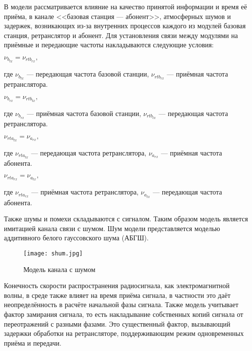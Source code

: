 \begin{onehalfspace}
	
	 В модели рассматривается влияние на качество принятой информации и время её приёма, в канале <<базовая станция — абонент>>, атмосферных шумов и задержек, возникающих из-за внутренних процессов каждого из модулей базовая станция, ретранслятор и абонент. Для установления связи между модулями на приёмные и передающие частоты накладываются следующие условия:
    
	
	\begin{center}
	$\nu_{b_{tx}} = \nu_{rtb_{rx}},$
	 
	где $\nu_{b_{tx}}$ — передающая частота базовой станции, $\nu_{rtb_{rx}}$ — приёмная частота ретранслятора.
	 
	 
	$\nu_{b_{rx}} = \nu_{rtb_{tx}},$
	 
	где $\nu_{b_{rx}}$ — приёмная частота базовой станции, $ \nu_{rtb_{tx}}$ — передающая частота ретранслятора.
	\end{center}
	 
	 
	\begin{center}
	$\nu_{rta_{tx}} = \nu_{a_{rx}},$
	 
	где $\nu_{rta_{tx}} $ — передающая частота ретранслятора, $\nu_{a_{rx}}$ — приёмная частота абонента.
	 
	 
	$\nu_{rta_{rx}} = \nu_{a_{tx}},$
	 
	где $\nu_{rta_{rx}} $ — приёмная частота ретранслятора, $\nu_{a_{tx}}$ — передающая частота абонента.
	\end{center}

	
	Также шумы и помехи складываются с сигналом. Таким образом модель является имитацией канала связи с шумом.	Шум модели представляется моделью аддитивного белого гауссовского шума (АБГШ).

\end{onehalfspace}
 
	\begin{center}
		\begin{figure}[h!]
			\centering
			\texttt{[image: shum.jpg]}
			\caption{Модель канала с шумом}
			\label{fig:model11}
		\end{figure}
	\end{center}

 
\begin{onehalfspace}
Конечность скорости распространения радиосигнала, как электромагнитной волны, в среде также влияет на время приёма сигнала, в частности это даёт неопределённость в расчёте начальной фазы сигнала. Также модель учитывает фактор замирания сигнала, то есть накладывание собственных копий сигнала от переотражений с разными фазами. Это существенный фактор, вызывающий задержки обработки на ретрансляторе, поддерживающим режим одновременных приёма и передачи.
\end{onehalfspace}
	
